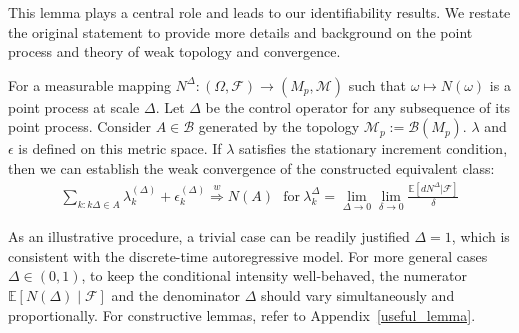 \documentclass[10pt]{article}
\numberwithin{figure}{section}
\begin{document}
This lemma plays a central role and leads to our identifiability results. We restate the original statement to provide more details and background on the point process and theory of weak topology and convergence. 
\begin{alemma}\label{formal_lemma_2}
For a measurable mapping $N^{\Delta}: (\Omega,\mathcal{F})\rightarrow (M_p,\mathcal{M})$ such that $\omega \mapsto N(\omega)$ is a point process at scale $\Delta$. Let $\Delta$ be the control operator for any subsequence of its point process. Consider $A\in \mathcal{B}$ generated by the topology $\mathcal{M}_p := \mathcal{B}(M_p)$.  $\lambda$ and $\epsilon$ is defined on this metric space. If $\lambda$ satisfies the stationary increment condition, then we can establish the weak convergence of the constructed equivalent class:
\begin{align*}
    \sum\limits_{k:k\Delta \in A}{}\lambda_k^{(\Delta)}+\epsilon_k^{(\Delta)}\overset{w} {\Rightarrow} N(A)~~~\text{for}~ \lambda_k^{\Delta}=\lim\limits_{\Delta\rightarrow 0}{}\lim\limits_{\delta\rightarrow 0}{}\frac{\mathbb{E}[dN^{\Delta}|\mathcal{F}]}{\delta}
\end{align*}
\end{alemma}

As an illustrative procedure, a trivial case can be readily justified $\Delta = 1$, which is consistent with the discrete-time autoregressive model. For more general cases $\Delta \in (0,1)$, to keep the conditional intensity well-behaved, the numerator $\mathbb{E}[N(\Delta)\mid\mathcal{F}]$ and the denominator $\Delta$ should vary simultaneously and proportionally. For constructive lemmas, refer to Appendix~\ref{useful_lemma}.
\end{document}
